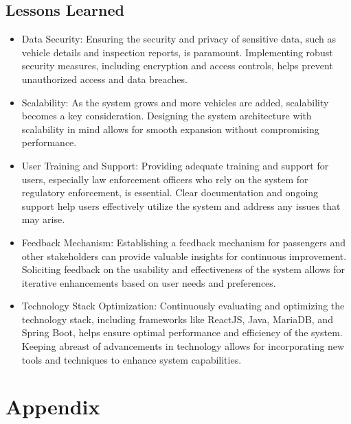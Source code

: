 \documentclass[a4paper, 12pt]{report}
\begin{document}
\section{Lessons Learned}
\begin{itemize}
    \item Data Security: Ensuring the security and privacy of sensitive data, such as vehicle details and inspection reports, is paramount. Implementing robust security measures, including encryption and access controls, helps prevent unauthorized access and data breaches.
    \item Scalability: As the system grows and more vehicles are added, scalability becomes a key consideration. Designing the system architecture with scalability in mind allows for smooth expansion without compromising performance.
    \item User Training and Support: Providing adequate training and support for users, especially law enforcement officers who rely on the system for regulatory enforcement, is essential. Clear documentation and ongoing support help users effectively utilize the system and address any issues that may arise.
    \item Feedback Mechanism: Establishing a feedback mechanism for passengers and other stakeholders can provide valuable insights for continuous improvement. Soliciting feedback on the usability and effectiveness of the system allows for iterative enhancements based on user needs and preferences.
    \item Technology Stack Optimization: Continuously evaluating and optimizing the technology stack, including frameworks like ReactJS, Java, MariaDB, and Spring Boot, helps ensure optimal performance and efficiency of the system. Keeping abreast of advancements in technology allows for incorporating new tools and techniques to enhance system capabilities.
\end{itemize}
\chapter{Appendix}


\end{document}
